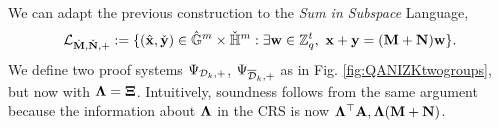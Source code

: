 We can adapt the previous construction to the \textit{Sum in Subspace} Language, 
 $$\mathcal{L}_{{\hat{\mathbf{{M}}}},\check{\mathbf{{N}}},+}:=\{ ({\hat{\mathbf{x}}},\check{\mathbf{y}}) \in {\ensuremath{\hat{\mathbb{G}}}}^{m} \times {\ensuremath{\check{\mathbb{H}}}}^{m} :  \exists \mathbf{w} \in \mathbb{Z}_q^{t}, \  \mathbf{x}+\mathbf{y}=(\mathbf{{M}}+\mathbf{{N}}) \mathbf{w}\}.$$
 We define two proof systems $\Psi_{\mathcal{D}_k,+}$, $\Psi_{\overline{\mathcal{D}}_k,+}$ as in Fig. \ref{fig:QANIZKtwogroups}, but now 
with $\mathbf{{\Lambda}}=\mathbf{{\Xi}}$. 
Intuitively, soundness follows from the same argument 
because the information 
about $\mathbf{{\Lambda}}$ in the CRS is now $\mathbf{{\Lambda}}^{\top}\mathbf{{A}},\mathbf{{\Lambda}}(\mathbf{{M}}+\mathbf{{N}})$.
